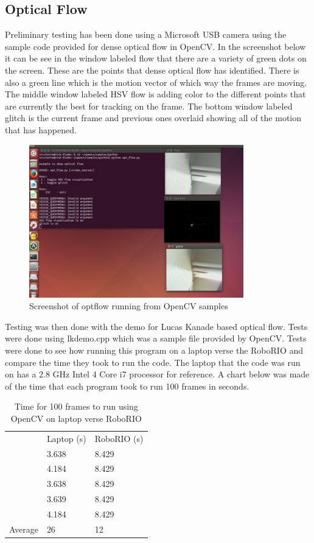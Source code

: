 \documentclass{article}
\begin{document}
	\subsection{Optical Flow}
    Preliminary testing has been done using a Microsoft USB camera using the sample code provided for dense optical flow in OpenCV. In the screenshot below it can be see in the window labeled flow that there are a variety of green dots on the screen. These are the points that dense optical flow has identified. There is also a green line which is the motion vector of which way the frames are moving. The middle window labeled HSV flow is adding color to the different points that are currently the best for tracking on the frame. The bottom window labeled glitch is the current frame and previous ones overlaid showing all of the motion that has happened.
      \begin{figure}[H]
        \centering
        \includegraphics[scale=0.75]{./images/optflow.png}
        \caption{Screenshot of optflow running from OpenCV samples}
        \label{fig:opt_flow}
      \end{figure}
	Testing was then done with the demo for Lucas Kanade based optical flow. Tests were done using lkdemo.cpp which was a sample file provided by OpenCV. Tests were done to see how running this program on a laptop verse the RoboRIO and compare the time they took to run the code. The laptop that the code was run on has a 2.8 GHz Intel 4 Core i7 processor for reference. A chart below was made of the time that each program took to run 100 frames in seconds.
     \begin{table}[H]
     	\centering
        \label{table:optical_flow_benchmark}
        \begin{tabular}{l|l|l|}
          \cline{2-3}
          & Laptop (s) & RoboRIO (s) \\
          \cline{2-3}
          & 3.638 & 8.429 \\
          & 4.184 & 8.429\\
          & 3.638 & 8.429 \\
          & 3.639 & 8.429 \\
          & 4.184 & 8.429 \\
          \hline
          \multicolumn{1}{|l|}{Average} & 26 & 12 \\
          \hline
        \end{tabular}
        \caption{Time for 100 frames to run using OpenCV on laptop verse RoboRIO}
      \end{table}
\end{document}

